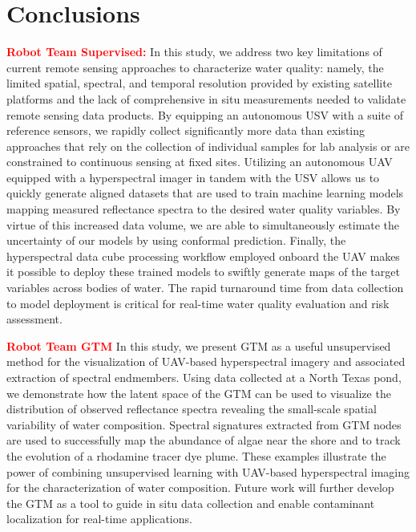 \chapter{Conclusions}\label{ch:conclusions}

\textcolor{red}{\textbf{Robot Team Supervised:}}
In this study, we address two key limitations of current remote sensing
approaches to characterize water quality: namely, the limited spatial, spectral,
and temporal resolution provided by existing satellite platforms and the lack of
comprehensive in situ measurements needed to validate remote sensing data
products. By equipping an autonomous USV with a suite of reference sensors, we
rapidly collect significantly more data than existing approaches that rely on
the collection of individual samples for lab analysis or are constrained to
continuous sensing at fixed sites. Utilizing an autonomous UAV equipped with a
hyperspectral imager in tandem with the USV allows us to quickly generate
aligned datasets that are used to train machine learning models mapping measured
reflectance spectra to the desired water quality variables. By virtue of this
increased data volume, we are able to simultaneously estimate the uncertainty of
our models by using conformal prediction. Finally, the hyperspectral data cube
processing workflow employed onboard the UAV makes it possible to deploy these
trained models to swiftly generate maps of the target variables across bodies of
water. The rapid turnaround time from data collection to model deployment is
critical for real-time water quality evaluation and risk assessment.




\textcolor{red}{\textbf{Robot Team GTM}}
In this study, we present  GTM as a useful unsupervised method for the visualization of UAV-based hyperspectral imagery and associated extraction of spectral endmembers. Using data collected at a North Texas pond, we demonstrate how the latent space of the GTM can be used to visualize the distribution of observed reflectance spectra revealing the small-scale spatial variability of water composition. Spectral signatures extracted from GTM nodes are used to successfully map the abundance of algae near the shore and to track the evolution of a rhodamine tracer dye plume. These examples illustrate the power of combining unsupervised learning with UAV-based hyperspectral imaging for the characterization of water composition. Future work will further develop the GTM as a tool to guide in situ data collection and enable contaminant localization for real-time applications.

